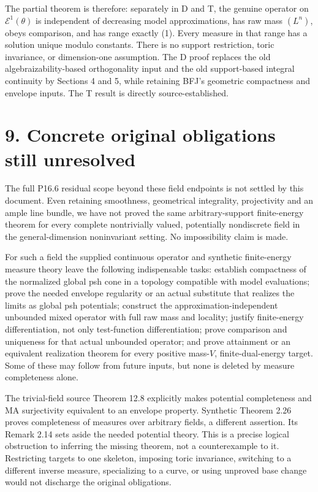 \documentclass[11pt]{article}
\begin{document}
The partial theorem is therefore: separately in D and T, the genuine operator on \(\mathcal E^1(\theta)\) is independent of decreasing model approximations, has raw mass \((L^n)\), obeys comparison, and has range exactly (1). Every measure in that range has a solution unique modulo constants. There is no support restriction, toric invariance, or dimension-one assumption. The D proof replaces the old algebraizability-based orthogonality input and the old support-based integral continuity by Sections 4 and 5, while retaining BFJ's geometric compactness and envelope inputs. The T result is directly source-established.

\section*{9. Concrete original obligations still unresolved}

The full P16.6 residual scope beyond these field endpoints is not settled by this document. Even retaining smoothness, geometrical integrality, projectivity and an ample line bundle, we have not proved the same arbitrary-support finite-energy theorem for every complete nontrivially valued, potentially nondiscrete field in the general-dimension noninvariant setting. No impossibility claim is made.

For such a field the supplied continuous operator and synthetic finite-energy measure theory leave the following indispensable tasks: establish compactness of the normalized global psh cone in a topology compatible with model evaluations; prove the needed envelope regularity or an actual substitute that realizes the limits as global psh potentials; construct the approximation-independent unbounded mixed operator with full raw mass and locality; justify finite-energy differentiation, not only test-function differentiation; prove comparison and uniqueness for that actual unbounded operator; and prove attainment or an equivalent realization theorem for every positive mass-\(V\), finite-dual-energy target. Some of these may follow from future inputs, but none is deleted by measure completeness alone.

The trivial-field source Theorem 12.8 explicitly makes potential completeness and MA surjectivity equivalent to an envelope property. Synthetic Theorem 2.26 proves completeness of measures over arbitrary fields, a different assertion. Its Remark 2.14 sets aside the needed potential theory. This is a precise logical obstruction to inferring the missing theorem, not a counterexample to it. Restricting targets to one skeleton, imposing toric invariance, switching to a different inverse measure, specializing to a curve, or using unproved base change would not discharge the original obligations.
\end{document}
